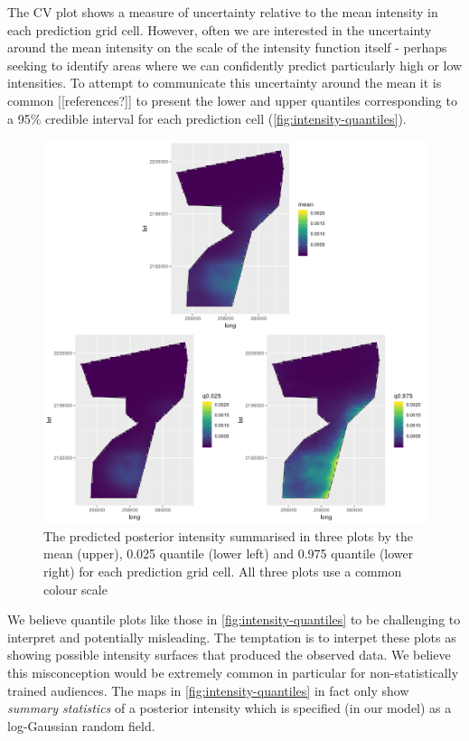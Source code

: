 \documentclass[preprint,12pt]{elsarticle}
\begin{document}
The CV plot shows a measure of uncertainty relative to the mean intensity in each prediction grid cell.  However, often we are interested in the uncertainty around the mean intensity on the scale of the intensity function itself - perhaps seeking to identify areas where we can confidently predict particularly high or low intensities.  To attempt to communicate this uncertainty around the mean it is common [[references?]] to present the lower and upper quantiles corresponding to a 95\% credible interval for each prediction cell (\autoref{fig:intensity-quantiles}).  

\begin{figure}
	\includegraphics[scale=0.5]{figures/intensity_quantiles.png}
	\caption{The predicted posterior intensity summarised in three plots by the mean (upper),  0.025 quantile (lower left) and 0.975 quantile (lower right) for each prediction grid cell.  All three plots use a common colour scale}
	\label{fig:intensity-quantiles}
\end{figure}

We believe quantile plots like those in \autoref{fig:intensity-quantiles} to be challenging to interpret and potentially misleading.  The temptation is to interpet these plots as showing possible intensity surfaces that produced the observed data.  We believe this misconception would be extremely common in particular for non-statistically trained audiences. The maps in \autoref{fig:intensity-quantiles} in fact only show \textit{summary statistics} of a posterior intensity which is specified (in our model) as a log-Gaussian random field.
\end{document}
